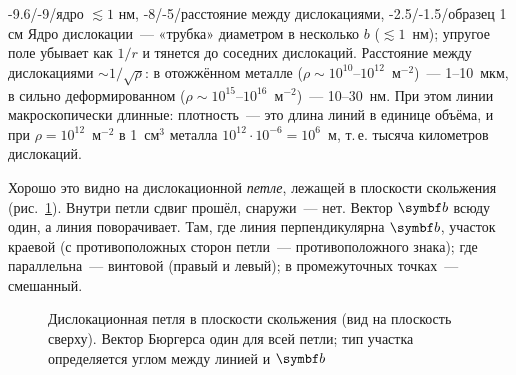 \begin{masshtab}[дислокация]{-9.6/-9/{ядро $\lesssim1$ нм}, -8/-5/{расстояние между дислокациями}, -2.5/-1.5/{образец 1 см}}
Ядро дислокации~— «трубка» диаметром в несколько $b$ ($\lesssim1$~нм);
упругое поле убывает как $1/r$ и тянется до соседних дислокаций.
Расстояние между дислокациями $\sim1/\sqrt\rho$: в отожжённом металле
($\rho\sim10^{10}$--$10^{12}$~м$^{-2}$)~— 1--10~мкм, в сильно деформированном
($\rho\sim10^{15}$--$10^{16}$~м$^{-2}$)~— 10--30~нм. При этом линии
макроскопически длинные: плотность~— это длина линий в единице объёма,
и при $\rho=10^{12}$~м$^{-2}$ в 1~см$^3$ металла $10^{12}\cdot10^{-6}=10^6$~м,
т.\,е. тысяча километров дислокаций.
\end{masshtab}

Хорошо это видно на дислокационной \emph{петле}, лежащей в плоскости
скольжения (рис.~\ref{fig:loop-types}). Внутри петли сдвиг прошёл,
снаружи~— нет. Вектор $\vb b$ всюду один, а линия поворачивает. Там, где
линия перпендикулярна $\vb b$, участок краевой (с противоположных сторон
петли~— противоположного знака); где параллельна~— винтовой (правый и
левый); в промежуточных точках~— смешанный.

\begin{figure}[ht]
\centering
{}
\caption{Дислокационная петля в плоскости скольжения (вид на плоскость
сверху). Вектор Бюргерса один для всей петли; тип участка определяется
углом между линией и $\vb b$}
\label{fig:loop-types}
\end{figure}

